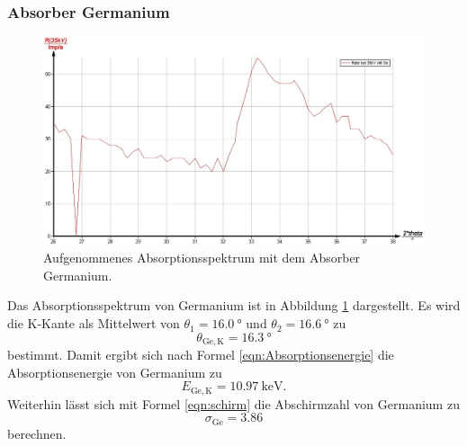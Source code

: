 \subsubsection{Absorber Germanium}
\begin{figure}
	\centering
	\includegraphics[width=1.0\textwidth]{nIKO_und_jULIAN_ÜLADS/germanium.jpg}
	\caption{Aufgenommenes Absorptionsspektrum mit dem Absorber Germanium.}
	\label{fig:germanium_absorber}
\end{figure}
Das Absorptionsspektrum von Germanium ist in Abbildung \ref{fig:germanium_absorber}
dargestellt. Es wird die K-Kante als Mittelwert von $\theta_1 = \SI{16,0}{\degree}$ und
$\theta_2 = \SI{16,6}{\degree}$ zu
\begin{equation*}
	\theta_{\mathrm{Ge,K}} = \SI{16,3}{\degree}
\end{equation*}
bestimmt. Damit ergibt sich nach Formel \eqref{eqn:Absorptionsenergie} die Absorptionsenergie
von Germanium zu
\begin{equation*}
	E_{\mathrm{Ge,K}} = \SI{10,97}{\kilo\electronvolt} \mathrm{.}
\end{equation*}
Weiterhin lässt sich mit Formel \eqref{eqn:schirm} die Abschirmzahl von Germanium zu
\begin{equation*}
	\sigma_{\mathrm{Ge}} = \num{3,86}
\end{equation*}
berechnen.

\FloatBarrier
